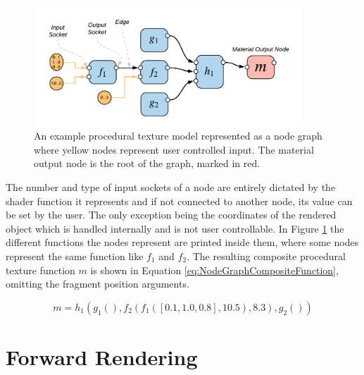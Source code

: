 \begin{figure}[h]
    \centering
    \includegraphics[width=0.9\textwidth]{img/method/Node Graph.pdf}
    \caption{An example procedural texture model represented as a node graph where yellow nodes represent user controlled input. The material output node is the root of the graph, marked in red.}
    \label{fig:NodeGraph}
\end{figure}

The number and type of input sockets of a node are entirely dictated by the shader function it represents and if not connected to another node, its value can be set by the user. The only exception being the coordinates of the rendered object which is handled internally and is not user controllable. In Figure \ref{fig:NodeGraph} the different functions the nodes represent are printed inside them, where some nodes represent the same function like $f_1$ and $f_2$. The resulting composite procedural texture function $m$ is shown in Equation \ref{eq:NodeGraphCompositeFunction}, omitting the fragment position arguments.

\begin{equation}
    m = h_1(g_1(), f_2(f_1(\left[0.1, 1.0, 0.8\right], 10.5), 8.3), g_2())
    \label{eq:NodeGraphCompositeFunction}
\end{equation}



\section{Forward Rendering}\label{sec:RenderingInOpenGL}

